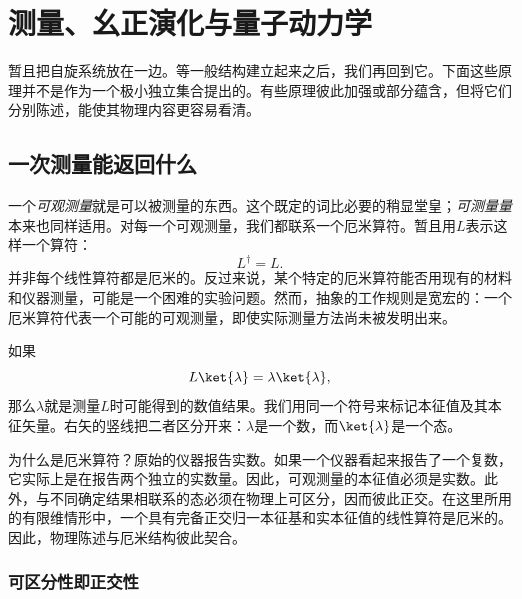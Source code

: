 \chapter{测量、幺正演化与量子动力学}


暂且把自旋系统放在一边。等一般结构建立起来之后，我们再回到它。下面这些原理并不是作为一个极小独立集合提出的。有些原理彼此加强或部分蕴含，但将它们分别陈述，能使其物理内容更容易看清。

\section{一次测量能返回什么}

一个\emph{可观测量}就是可以被测量的东西。这个既定的词比必要的稍显堂皇；\emph{可测量量}本来也同样适用。对每一个可观测量，我们都联系一个厄米算符。暂且用\(L\)表示这样一个算符：
\begin{equation}
L^\dagger=L.
\end{equation}
并非每个线性算符都是厄米的。反过来说，某个特定的厄米算符能否用现有的材料和仪器测量，可能是一个困难的实验问题。然而，抽象的工作规则是宽宏的：一个厄米算符代表一个可能的可观测量，即使实际测量方法尚未被发明出来。

如果
\begin{equation}
L\ket{\lambda}=\lambda\ket{\lambda},
\end{equation}
那么\(\lambda\)就是测量\(L\)时可能得到的数值结果。我们用同一个符号来标记本征值及其本征矢量。右矢的竖线把二者区分开来：\(\lambda\)是一个数，而\(\ket{\lambda}\)是一个态。

为什么是厄米算符？原始的仪器报告实数。如果一个仪器看起来报告了一个复数，它实际上是在报告两个独立的实数量。因此，可观测量的本征值必须是实数。此外，与不同确定结果相联系的态必须在物理上可区分，因而彼此正交。在这里所用的有限维情形中，一个具有完备正交归一本征基和实本征值的线性算符是厄米的。因此，物理陈述与厄米结构彼此契合。

\subsection{可区分性即正交性}

